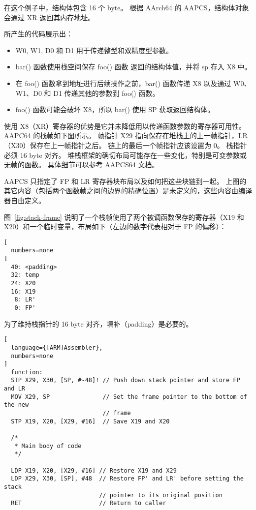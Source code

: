 在这个例子中，结构体包含 16 个 byte。
根据 AArch64 的 AAPCS，结构体对象会通过 XR 返回其内存地址。

所产生的代码展示出：

\begin{itemize}
  \item W0, W1, D0 和 D1 用于传递整型和双精度型参数。
  \item bar() 函数使用栈空间保存 foo() 函数 返回的结构体值，并将 sp 存入 X8 中。
  \item 在 foo() 函数拿到地址进行后续操作之前，bar() 函数传递 X8 以及通过 W0、W1、D0 和 D1 传递其他的参数到 foo() 函数。
  \item foo() 函数可能会破坏 X8，所以 bar() 使用 SP 获取返回结构体。
\end{itemize}

使用 X8（XR）寄存器的优势是它并未降低用以传递函数参数的寄存器可用性。
AAPC64 的栈帧如下图所示。
帧指针 X29 指向保存在堆栈上的上一帧指针，LR（X30）保存在上一帧指针之后。
链上的最后一个帧指针应该设置为 0。
栈指针必须 16 byte 对齐。
堆栈框架的确切布局可能存在一些变化，特别是可变参数或无帧的函数。
具体细节可以参考 AAPCS64 文档。


\begin{Tcbox}[title={Note}]
  AAPCS 只指定了 FP 和 LR 寄存器块布局以及如何把这些块链到一起。
  上图的其它内容（包括两个函数帧之间的边界的精确位置）是未定义的，这些内容由编译器自由定义。
\end{Tcbox}

图~\ref{fig:stack-frame} 说明了一个栈帧使用了两个被调函数保存的寄存器（X19 和 X20）和一个临时变量，布局如下（左边的数字代表相对于 FP 的偏移）：

\begin{lstlisting}[
  numbers=none
]
  40: <padding>
  32: temp
  24: X20
  16: X19
   8: LR'
   0: FP'
\end{lstlisting}

为了维持栈指针的 16 byte 对齐，填补（padding）是必要的。

\begin{lstlisting}[
  language={[ARM]Assembler},
  numbers=none
]
  function:
  STP X29, X30, [SP, #-48]! // Push down stack pointer and store FP and LR
  MOV X29, SP               // Set the frame pointer to the bottom of the new
                            // frame
  STP X19, X20, [X29, #16]  // Save X19 and X20

  /*
   * Main body of code
   */

  LDP X19, X20, [X29, #16] // Restore X19 and X29
  LDP X29, X30, [SP], #48  // Restore FP' and LR' before setting the stack
                           // pointer to its original position
  RET                      // Return to caller
\end{lstlisting}

